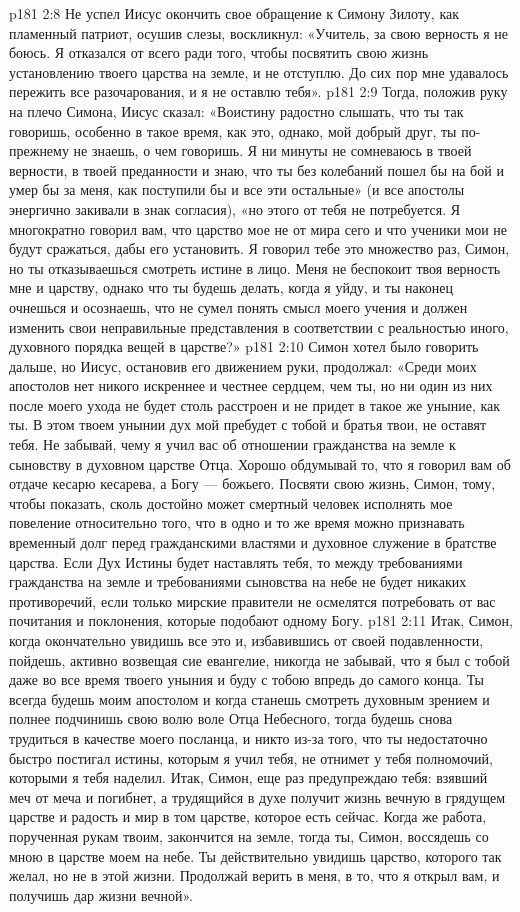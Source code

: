 \vs p181 2:8 Не успел Иисус окончить свое обращение к Симону Зилоту, как пламенный патриот, осушив слезы, воскликнул: «Учитель, за свою верность я не боюсь. Я отказался от всего ради того, чтобы посвятить свою жизнь установлению твоего царства на земле, и не отступлю. До сих пор мне удавалось пережить все разочарования, и я не оставлю тебя».
\vs p181 2:9 Тогда, положив руку на плечо Симона, Иисус сказал: «Воистину радостно слышать, что ты так говоришь, особенно в такое время, как это, однако, мой добрый друг, ты по\hyp{}прежнему не знаешь, о чем говоришь. Я ни минуты не сомневаюсь в твоей верности, в твоей преданности и знаю, что ты без колебаний пошел бы на бой и умер бы за меня, как поступили бы и все эти остальные» (и все апостолы энергично закивали в знак согласия), «но этого от тебя не потребуется. Я многократно говорил вам, что царство мое не от мира сего и что ученики мои не будут сражаться, дабы его установить. Я говорил тебе это множество раз, Симон, но ты отказываешься смотреть истине в лицо. Меня не беспокоит твоя верность мне и царству, однако что ты будешь делать, когда я уйду, и ты наконец очнешься и осознаешь, что не сумел понять смысл моего учения и должен изменить свои неправильные представления в соответствии с реальностью иного, духовного порядка вещей в царстве?»
\vs p181 2:10 Симон хотел было говорить дальше, но Иисус, остановив его движением руки, продолжал: «Среди моих апостолов нет никого искреннее и честнее сердцем, чем ты, но ни один из них после моего ухода не будет столь расстроен и не придет в такое же уныние, как ты. В этом твоем унынии дух мой пребудет с тобой и братья твои, не оставят тебя. Не забывай, чему я учил вас об отношении гражданства на земле к сыновству в духовном царстве Отца. Хорошо обдумывай то, что я говорил вам об отдаче кесарю кесарева, а Богу --- божьего. Посвяти свою жизнь, Симон, тому, чтобы показать, сколь достойно может смертный человек исполнять мое повеление относительно того, что в одно и то же время можно признавать временный долг перед гражданскими властями и духовное служение в братстве царства. Если Дух Истины будет наставлять тебя, то между требованиями гражданства на земле и требованиями сыновства на небе не будет никаких противоречий, если только мирские правители не осмелятся потребовать от вас почитания и поклонения, которые подобают одному Богу.
\vs p181 2:11 \pc Итак, Симон, когда окончательно увидишь все это и, избавившись от своей подавленности, пойдешь, активно возвещая сие евангелие, никогда не забывай, что я был с тобой даже во все время твоего уныния и буду с тобою впредь до самого конца. Ты всегда будешь моим апостолом и когда станешь смотреть духовным зрением и полнее подчинишь свою волю воле Отца Небесного, тогда будешь снова трудиться в качестве моего посланца, и никто из\hyp{}за того, что ты недостаточно быстро постигал истины, которым я учил тебя, не отнимет у тебя полномочий, которыми я тебя наделил. Итак, Симон, еще раз предупреждаю тебя: взявший меч от меча и погибнет, а трудящийся в духе получит жизнь вечную в грядущем царстве и радость и мир в том царстве, которое есть сейчас. Когда же работа, порученная рукам твоим, закончится на земле, тогда ты, Симон, воссядешь со мною в царстве моем на небе. Ты действительно увидишь царство, которого так желал, но не в этой жизни. Продолжай верить в меня, в то, что я открыл вам, и получишь дар жизни вечной».
